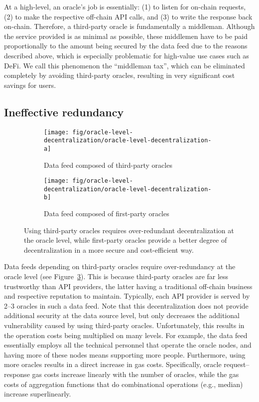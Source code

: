 \documentclass[11pt]{article}
\begin{document}
At a high-level, an oracle’s job is essentially: (1) to listen for on-chain requests, (2) to make the respective off-chain API calls, and (3) to write the response back on-chain.
Therefore, a third-party oracle is fundamentally a middleman.
Although the service provided is as minimal as possible, these middlemen have to be paid proportionally to the amount being secured by the data feed due to the reasons described above, which is especially problematic for high-value use cases such as DeFi.
We call this phenomenon the ``middleman tax'', which can be eliminated completely by avoiding third-party oracles, resulting in very significant cost savings for users.

\subsection{Ineffective redundancy}
\label{sec:ineffective-redundancy}

\begin{figure}
    \centering
    \begin{subfigure}{0.513398876\textwidth}
         \centering
         \texttt{[image: fig/oracle-level-decentralization/oracle-level-decentralization-a]}
         \caption{Data feed composed of third-party oracles}
         \label{fig:oracle-level-decentralization-a}
     \end{subfigure}
     \hfill
     \begin{subfigure}{0.466601124\textwidth}
         \centering
         \texttt{[image: fig/oracle-level-decentralization/oracle-level-decentralization-b]}
         \caption{Data feed composed of first-party oracles}
         \label{fig:oracle-level-decentralization-b}
     \end{subfigure}
	\caption{Using third-party oracles requires over-redundant decentralization at the oracle level, while first-party oracles provide a better degree of decentralization in a more secure and cost-efficient way.}
	\label{fig:oracle-level-decentralization}
\end{figure}

Data feeds depending on third-party oracles require over-redundancy at the oracle level (see Figure~\ref{fig:oracle-level-decentralization}).
This is because third-party oracles are far less trustworthy than API providers, the latter having a traditional off-chain business and respective reputation to maintain.
Typically, each API provider is served by 2--3 oracles in such a data feed.
Note that this decentralization does not provide additional security at the data source level, but only decreases the additional vulnerability caused by using third-party oracles.
Unfortunately, this results in the operation costs being multiplied on many levels.
For example, the data feed essentially employs all the technical personnel that operate the oracle nodes, and having more of these nodes means supporting more people.
Furthermore, using more oracles results in a direct increase in gas costs.
Specifically, oracle request--response gas costs increase linearly with the number of oracles, while the gas costs of aggregation functions that do combinational operations (e.g., median) increase superlinearly.
\end{document}
